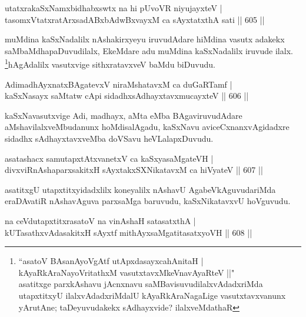 
\begin{shl}
utatxrakaSxNamxbidhabxswtx na hi pUvoVR niyujayxteV | \\
tasomxVtatxratArxsadABxbAdwBxvayxM ca sAyxtatxthA sati \hfill||  605 ||  
\end{shl}

\begin{artha}
muMdina kaSxNadalilx nAshakirxyeyu iruvudAdare hiMdina vasutx adakekx saMbaMdhapaDuvudilalx, EkeMdare adu muMdina kaSxNadalilx iruvude ilalx. \footnote{``asatoV BAsanAyoVgAtf utApxdasayxcahAnitaH |\\
kAyaRkAraNayoVritathxM vasutxtavxMkeVnavAyaRteV ||"\\asatitxge parxkAshavu jAcnxnavu saMBavisuvudilalxvAdadxriMda utapxtitxyU ilalxvAdadxriMdalU kAyaRkAraNagaLige vasutxtavxvanunx yArutAne; taDeyuvudakekx sAdhayxvide? ilalxveMdathaR}hAgAdalilx vasutxvige sithxratavxveV baMdu biDuvudu.
\end{artha}

\begin{shl}
AdimadhAyxnatxBAgatevxV niraMshatavxM ca duGaRTamf | \\
kaSxNasayx saMtatw cApi sidadhxsAdhayxtavxmucayxteV \hfill||  606 ||  
\end{shl}

\begin{artha}
kaSxNavasutxvige Adi, madhayx, aMta eMba BAgaviruvudAdare aMshavilalxveMbudanunx hoMdisalAgadu, kaSxNavu aviceCxnanxvAgidadxre sidadhx sAdhayxtavxveMba doVSavu heVLalapxDuvudu.
\end{artha}

\begin{shl}
asatashacx samutapxtAtxvanetxV ca kaSxyasaMgateVH | \\
divxviRnAshaparxsakitxH sAyxtakxSXNikatavxM ca hiVyateV \hfill||  607 ||  
\end{shl}	

\begin{artha}
asatitxgU utapxtitxyidadxlilx koneyalilx nAshavU AgabeVkAguvudariMda eraDAvatiR nAshavAguva parxsaMga baruvudu, kaSxNikatavxvU hoVguvudu.
\end{artha}

\begin{shl}
na ceVdutapxtitxrasatoV na vinAshaH satasatxthA | \\
kUTasathxvAdasakitxH sAyxtf \footnotemark[1]mithAyxsaMgatitasatxyoVH \hfill||  608 ||  
\end{shl}

